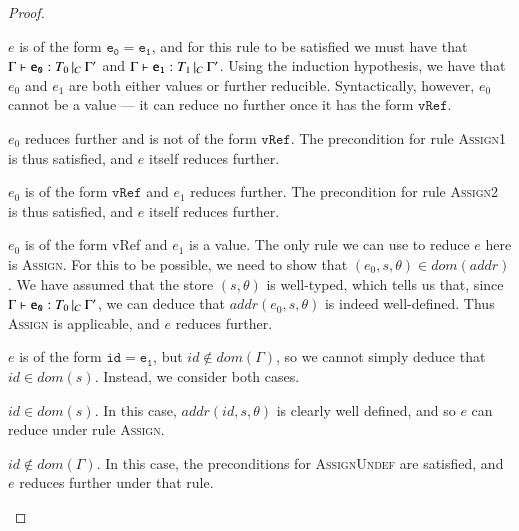 \begin{proof}
\begin{case}
  \end{case}

  \begin{case}[AssignType]\label{case:prog-assigntype}

	$e$ is of the form $\mathtt{e_0 = e_1}$, and for this rule to be satisfied
	we must have that $\Gamma{}\vdash\mathtt{e_0}: T_0\,|_C\:\Gamma'$ and $\Gamma{}\vdash\mathtt{e_1}: T_1\,|_C\:\Gamma'$. Using the
	induction hypothesis, we have that $e_0$ and $e_1$ are both either values
	or further reducible. Syntactically, however, $e_0$ cannot be a value ---
	it can reduce no further once it has the form $\mathtt{vRef}$.

	\begin{subcase}
	  $e_0$ reduces further and is not of the form $\mathtt{vRef}$. 
	  The precondition for rule \textsc{Assign1} is thus satisfied, and $e$
	  itself reduces further.
	\end{subcase}

	\begin{subcase}
	  $e_0$ is of the form $\mathtt{vRef}$ and $e_1$ reduces further. 
	  The precondition for rule \textsc{Assign2} is thus satisfied, and $e$
	  itself reduces further.
	\end{subcase}

	\begin{subcase}
	  $e_0$ is of the form vRef and $e_1$ is a value.
	  The only rule we can use to reduce $e$ here is \textsc{Assign}. For this
	  to be possible, we need to show that $(e_0, s, \theta) \in dom(addr)$.
	  We have assumed that the store $(s,\theta)$ is well-typed, which tells us
	  that, since $\Gamma{}\vdash\mathtt{e_0}: T_0\,|_C\:\Gamma'$, we can deduce that $addr(e_0,s,\theta)$
	  is indeed well-defined. Thus \textsc{Assign} is applicable, and $e$
	  reduces further.  
	\end{subcase}

  \end{case}

  \begin{case}[AssignTypeUndef]\label{case:prog-assigntypeundef}

	$e$ is of the form $\mathtt{id = e_1}$, but $id \not\in dom(\Gamma)$, so we
	cannot simply deduce that $id \in dom(s)$. Instead, we consider both cases.

	\begin{subcase}
	  $id \in dom(s)$.
	  In this case, $addr(id, s, \theta)$ is clearly well defined, and so $e$
	  can reduce under rule \textsc{Assign}.
	\end{subcase}

  	\begin{subcase}
	  $id \not\in dom(\Gamma)$. 
	  In this case, the preconditions for \textsc{AssignUndef} are satisfied,
	  and $e$ reduces further under that rule.
	\end{subcase}


\end{case}
\end{proof}
